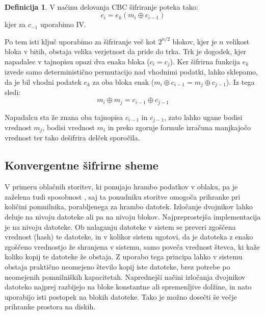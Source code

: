 \documentclass[12pt,a4paper,openany,tikz]{book}
\theoremstyle{plain}
\theoremstyle{definition}
\newtheorem{defn}[thm]{Definicija} %
\begin{document}
\

\begin{mdframed}[frametitle={Rojstnodnevni napad na način delovanja CBC}]
\begin{minipage}{\textwidth}
  \begin{defn}
    V načinu delovanja CBC šifriranje poteka tako: $$c_i = e_k(m_i \oplus c_{i-1})$$ kjer za $c_{-1}$ uporabimo \gls{IV}.

    Po tem isti ključ uporabimo za šifriranje več kot $2^{n/2}$ blokov, kjer je $n$ velikost bloka v bitih, obstaja velika verjetnost da pride do trka. Trk je dogodek, kjer napadalec v tajnopisu opazi dva enaka bloka ($c_i = c_j$). Ker šifrirna funkcija $e_k$ izvede samo deterministično permutacijo nad vhodnimi podatki, lahko sklepamo, da je bil vhodni podatek $e_k$ za oba bloka enak ($m_i \oplus c_{i-1} = m_j \oplus c_{j-1}$). Iz tega sledi: $$m_i \oplus m_j = c_{i-1} \oplus c_{j-1}$$

    Napadalcu sta že znana oba tajnopisa $c_{i-1}$ in $c_{j-1}$, zato lahko ugane bodisi vrednost $m_j$, bodisi vrednost $m_i$ in preko zgornje formule izračuna manjkajočo vrednost ter tako dešifrira delček sporočila.
    \label{def:bdayattack}
  \end{defn}
\end{minipage}
\end{mdframed}


\subsection*{Konvergentne šifrirne sheme}
\label{sub:Konvergentne šifrirne sheme}

V primeru oblačnih storitev, ki ponujajo hrambo podatkov v oblaku, pa je zaželena tudi sposobnost , saj ta ponudniku storitve omogoča prihranke pri količini pomnilnika, porabljenega za hrambo datotek. Izločanje dvojnikov lahko deluje na nivoju datoteke ali pa na nivoju blokov. Najpreprostejša implementacija je na nivoju datoteke. Ob nalaganju datoteke v sistem se preveri zgoščena vrednost (hash) te datoteke, in v kolikor sistem ugotovi, da je datoteka z enako zgoščeno vrednostjo že shranjena v sistemu, samo poveča vrednost števca, ki kaže koliko kopij te datoteke že obstaja. Z uporabo tega principa lahko v sistemu obstaja praktično neomejeno število kopij iste datoteke, brez potrebe po neomejenih pomnilniških kapacitetah. Naprednejši načini izločanja dvojnikov datoteko najprej razbijejo na bloke konstantne ali spremenljive dolžine, in nato uporabijo isti postopek na blokih datoteke. Tako je možno dosečti še večje prihranke prostora na diskih.
\end{document}
